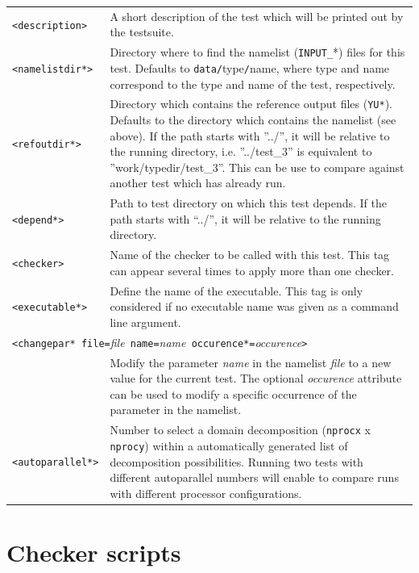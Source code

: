 \documentclass[12pt,twoside,a4paper]{report}
\newcommand{\tl}{\textless}
\newcommand{\tg}{\textgreater}
\newcommand{\tit}{\textit}
\begin{document}
\begin{tabular}{lp{12cm}}
\texttt{\tl description\tg} & A short description of the test which will be printed out by the testsuite.\\[1.2ex]
\texttt{\tl namelistdir*\tg} & Directory where to find the namelist (\texttt{INPUT\_}*) files for this test. Defaults to \texttt{data/}type\texttt{/}name, where type and name correspond to the type and name of the test, respectively.\\[1.2ex]
\texttt{\tl refoutdir*\tg} & Directory which contains the reference output files (\texttt{YU*}). Defaults to the directory which contains the namelist (see above). If the path starts with ''../'', it will be relative to the running directory, i.e. ''../test\_3'' is equivalent to ''work/typedir/test\_3''. This can be use to compare against another test which has already run.\\[1.2ex]
\texttt{\tl depend*\tg} & Path to test directory on which this test depends. If the path starts with ``../'', it will be relative to the running directory.\\[1.2ex]
\texttt{\tl checker\tg} & Name of the checker to be called with this test. This tag can appear several times to apply more than one checker.\\[1.2ex]
\texttt{\tl executable*\tg} & Define the name of the executable. This tag is only considered if no executable name was given as a command line argument.\\[1.2ex]
\multicolumn{2}{l}{\texttt{\tl changepar* file=}\tit{file}\texttt{ name=}\tit{name}\texttt{ occurence*=}\tit{occurence}\texttt{\tg}}\\
 & Modify the parameter \tit{name} in the namelist \tit{file} to a new value for the current test. The optional \tit{occurence}  attribute can be used to modify a specific occurrence of the parameter in the namelist.\\[1.2ex]
\texttt{\tl autoparallel*\tg} & Number to select a domain decomposition (\texttt{nprocx} x \texttt{nprocy}) within a automatically generated list of decomposition possibilities. Running two tests with different autoparallel numbers will enable to compare runs with different processor configurations.\\[1.2ex]
\end{tabular}


\newpage
\section{Checker scripts}
\label{sec:checker}
\end{document}
